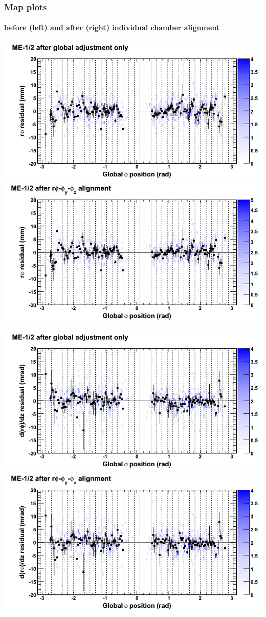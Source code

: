 \documentclass[compress]{beamer}
\begin{document}
\begin{frame}
\frametitle{Map plots}
\framesubtitle{before (left) and after (right) individual chamber alignment}
\includegraphics[width=0.5\linewidth]{ringmapplots_3dof/before_CSCvsphi_mem12_x.png} \includegraphics[width=0.5\linewidth]{ringmapplots_3dof/after_CSCvsphi_mem12_x.png}

\includegraphics[width=0.5\linewidth]{ringmapplots_3dof/before_CSCvsphi_mem12_dxdz.png} \includegraphics[width=0.5\linewidth]{ringmapplots_3dof/after_CSCvsphi_mem12_dxdz.png}
\end{frame}
\end{document}
